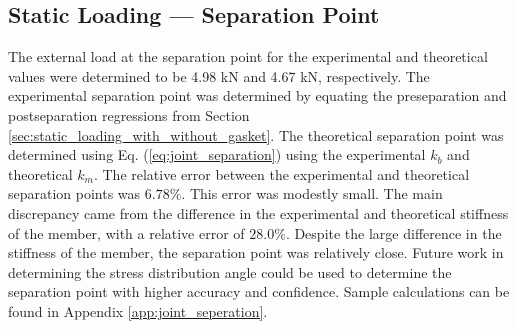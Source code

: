 \subsection{Static Loading --- Separation Point}
The external load at the separation point for the experimental and theoretical values were determined to be 4.98 kN and 4.67 kN, respectively. The experimental separation point was determined by equating the preseparation and postseparation regressions from Section \ref{sec:static_loading_with_without_gasket}. The theoretical separation point was determined using Eq. (\ref{eq:joint_separation}) using the experimental $k_b$ and theoretical $k_m$. The relative error between the experimental and theoretical separation points was $6.78\%$. This error was modestly small. The main discrepancy came from the difference in the experimental and theoretical stiffness of the member, with a relative error of $28.0\%$. Despite the large difference in the stiffness of the member, the separation point was relatively close. Future work in determining the stress distribution angle could be used to determine the separation point with higher accuracy and confidence. Sample calculations can be found in Appendix \ref{app:joint_seperation}.

